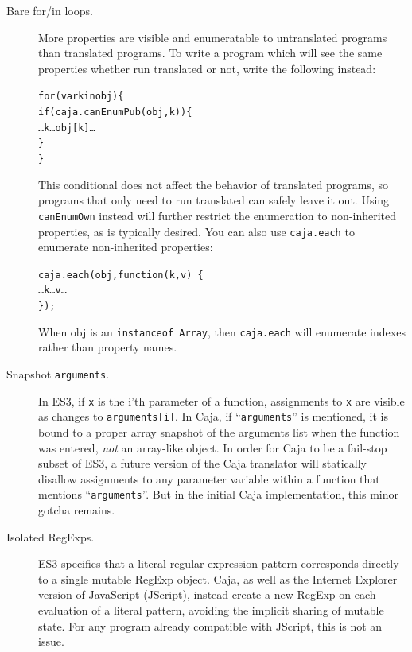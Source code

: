 \documentclass[letterpaper,twocolumn,10pt]{article}
\newcommand{\code}[1]{{\tt {#1}}}              %
\begin{document}
\begin{description}

  \item[Bare for/in loops.] More properties are visible and enumeratable to 
  untranslated programs than translated programs. To write a program which 
  will see the same properties whether run translated or not, write the 
  following instead:
%
\begin{alltt}
for (var k in obj) \{ 
  if (caja.canEnumPub(obj,k)) \{
    {\ldots}k{\ldots}obj[k]\ldots
  \}
\}
\end{alltt}
%
  This conditional does not affect the behavior of translated programs, so
  programs that only need to run translated can safely leave it out. Using
  \code{canEnumOwn} instead will further restrict the enumeration to
  non-inherited properties, as is typically desired. You can also use
  \code{caja.each} to enumerate non-inherited properties:
%
\begin{alltt}
caja.each(obj, function(k, v)\ \{ 
  {\ldots}k{\ldots}v\ldots
\});
\end{alltt}
%
  When obj is an \code{instanceof Array}, then \code{caja.each} will enumerate
  indexes rather than property names.

  \item[Snapshot \code{arguments}.] In ES3, if \code{x} is the i'th parameter 
  of a function, assignments to \code{x} are visible as changes to 
  \code{arguments[i]}. In Caja, if ``\code{arguments}'' is mentioned, it is 
  bound to a proper array snapshot of the arguments list when the function 
  was entered, \emph{not} an array-like object. In order for Caja to be a 
  fail-stop subset of ES3, a future version of the Caja translator will 
  statically disallow assignments to any parameter variable within a function 
  that mentions ``\code{arguments}''. But in the initial Caja implementation, 
  this minor gotcha remains.
  
  \item[Isolated RegExps.] ES3 specifies that a literal regular expression 
  pattern corresponds directly to a single mutable RegExp object. Caja, as 
  well as the Internet Explorer version of JavaScript (JScript), instead 
  create a new RegExp on each evaluation of a literal pattern, avoiding the 
  implicit sharing of mutable state. For any program already compatible with 
  JScript, this is not an issue.
    
\end{description}
\end{document}

